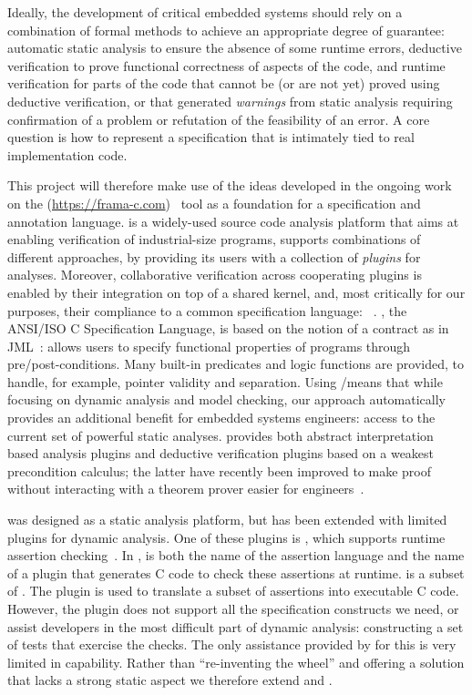 Ideally, the development of critical embedded systems should rely on a combination of formal methods to achieve an appropriate degree of guarantee:
automatic static analysis to ensure the absence of some runtime errors,
deductive verification to prove functional correctness of aspects of the code,
and runtime verification for parts of the code that cannot be (or are not yet) proved using deductive verification,
or that generated \emph{warnings} from static analysis requiring confirmation of a problem or refutation of the feasibility of an error.  A core question is how to represent a specification that is intimately tied to real implementation code.  

This project will therefore make use of the ideas developed in the ongoing work on the \framac{} (\url{https://frama-c.com})~\cite{KKP2015:FAC} tool as a foundation for a specification and annotation language.
\framac is a widely-used source code analysis platform that aims at enabling verification of industrial-size programs,
 supports combinations of different approaches, by providing its users with a collection of \emph{plugins} for analyses.
Moreover, collaborative verification across cooperating plugins is enabled by their integration on top of a shared kernel, and, most critically for our purposes, their compliance to a common specification language: \acsl~\cite{ACSL}.
\acsl, the ANSI/ISO C Specification Language, is based on the notion of a contract as in JML~\cite{jml}: \acsl allows users to specify functional properties of programs through pre/post-conditions.
Many built-in predicates and logic functions are provided, to handle, for example, pointer validity and separation.
Using \acsl/\framac means that while focusing on dynamic analysis and model checking, our approach automatically provides an additional benefit for embedded systems engineers: access to the current set of powerful \framac static analyses.  \framac provides both abstract interpretation~\cite{cousot77} based analysis plugins and deductive verification plugins based on a weakest precondition calculus; the latter have recently been improved to make proof without interacting with a theorem prover easier for engineers~\cite{BLK2019:NFM}.

\framac was designed as a static analysis platform, but has been extended with limited plugins for dynamic analysis.
One of these plugins is \eacsl, which supports runtime assertion checking~\cite{CR2006:SEN}.
In \framac, \eacsl is both the name of the assertion language and the name of a plugin that generates C code to check these assertions at runtime.
\eacsl is a subset of \acsl.  The plugin \eacsl is used to translate a subset of \framac assertions into executable C code.
However, the \eacsl plugin does not support all the specification constructs we need, or assist developers in the most difficult part of dynamic analysis:  constructing a set of tests that exercise the checks.  The only assistance provided by \framac for this is very limited in capability.  Rather than ``re-inventing the wheel'' and offering a solution that lacks a strong static aspect we therefore extend \acsl and \eacsl.